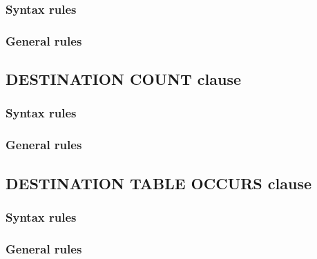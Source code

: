 \begin{syntax}[\deletedcolour]
\end{syntax}

\subsubsection{Syntax rules}

\subsubsection{General rules}

\subsection{DESTINATION COUNT clause}

\begin{syntax}[\deletedcolour]
\end{syntax}

\subsubsection{Syntax rules}

\subsubsection{General rules}

\subsection{DESTINATION TABLE OCCURS clause}

\begin{syntax}[\deletedcolour]
\end{syntax}

\subsubsection{Syntax rules}

\subsubsection{General rules}

